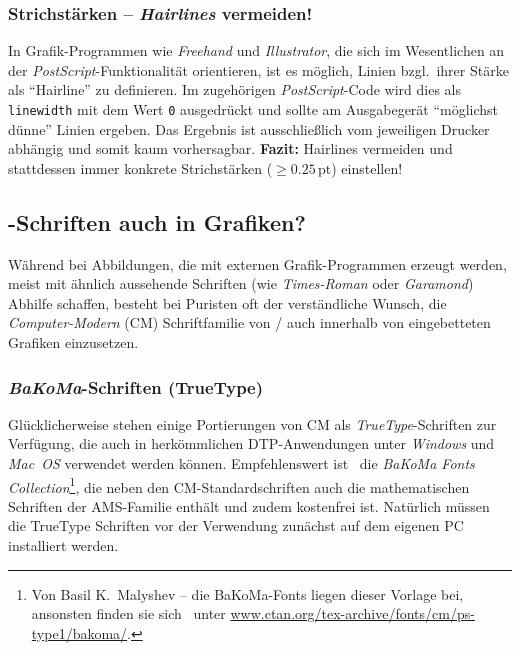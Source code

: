 \subsubsection{Strichstärken -- \emph{Hairlines} vermeiden!}

In Grafik-Programmen wie \emph{Freehand} und \emph{Illustrator},
die sich im Wesentlichen an der \emph{PostScript}-Funktionalität
orientieren, ist es möglich, Linien bzgl.\ ihrer Stärke als
"`Hairline"' zu definieren. Im zugehörigen \emph{PostScript}-Code
wird dies als \texttt{linewidth} mit dem Wert \texttt{0} ausgedrückt und
sollte am Ausgabegerät "`möglichst dünne"' Linien ergeben. 
Das Ergebnis ist ausschließlich vom jeweiligen Drucker
abhängig und somit kaum vorhersagbar.
\textbf{Fazit:} Hairlines vermeiden und stattdessen immer konkrete
Strichstärken ($\geq 0.25\,\mathrm{pt}$) einstellen!





\subsection{\tex-Schriften auch in Grafiken?}
\label{sec:tex-schriften-in-grafiken}

Während bei Abbildungen, die mit externen
Grafik-Programmen erzeugt werden, meist mit ähnlich aussehende
Schriften (wie \emph{Times-Roman} oder \emph{Garamond}) Abhilfe schaffen,
besteht bei Puristen oft der verständliche Wunsch, die 
\emph{Computer-Modern} (CM) Schriftfamilie von {\tex}/{\latex} auch
innerhalb von eingebetteten Grafiken einzusetzen.

\subsubsection{\emph{BaKoMa}-Schriften (TrueType)}

Glücklicherweise stehen einige Portierungen von CM als {\em
TrueType}-Schriften zur Verfügung, die auch in herkömmlichen
DTP-Anwendungen unter \emph{Windows} und \emph{Mac~OS} verwendet werden
können. Empfehlenswert ist \zB\ die \emph{BaKoMa Fonts
Collection}\footnote{Von Basil K.\ Malyshev -- die BaKoMa-Fonts
liegen dieser Vorlage bei, ansonsten finden sie sich \zB\ unter
\url{www.ctan.org/tex-archive/fonts/cm/ps-type1/bakoma/}.}, die
neben den CM-Standardschriften auch die mathematischen Schriften
der AMS-Familie ent\-hält und zudem kostenfrei ist. Natürlich
müssen die TrueType Schriften vor der Verwendung zunächst auf dem
eigenen PC installiert werden. 

